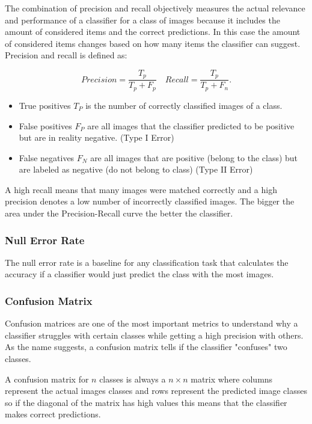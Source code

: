 The combination of precision and recall objectively measures the actual relevance and performance of a classifier for a class of images because it includes the amount of considered items and the correct predictions. In this case the amount of considered items changes based on how many items the classifier can suggest. Precision and recall is defined as:

\begin{equation}
Precision = \frac{T_p}{T_p+F_p} \quad Recall = \frac{T_p}{T_p+F_n}.
\end{equation}

\begin{itemize}
	\item True positives $T_P$ is the number of correctly classified images of a class.
	\item False positives $F_P$ are all images that the classifier predicted to be positive but are in reality negative. {(Type I Error)}
	\item False negatives $F_N$ are all images that are positive {(belong to the class)} but are labeled as negative {(do not belong to class)} {(Type II Error)}
\end{itemize}

A high recall means that many images were matched correctly and a high precision denotes a low number of incorrectly classified images. The bigger the area under the Precision-Recall curve the better the classifier.

\subsubsection*{Null Error Rate}
The null error rate is a baseline for any classification task that calculates the accuracy if a classifier would just predict the class with the most images.

\subsubsection*{Confusion Matrix}
Confusion matrices are one of the most important metrics to understand why a classifier struggles with certain classes while getting a high precision with others. As the name suggests, a confusion matrix tells if the classifier "confuses" two classes.

A confusion matrix for $n$ classes is always a $n \times n$ matrix where columns represent the actual images classes and rows represent the predicted image classes so if the diagonal of the matrix has high values this means that the classifier makes correct predictions.

